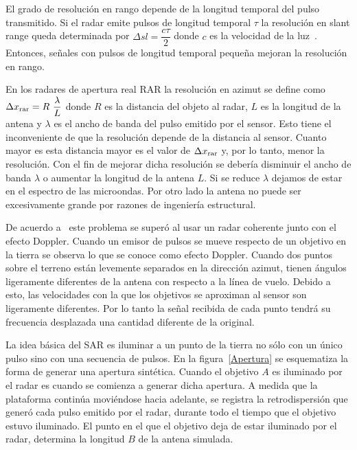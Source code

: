 El grado de resolución en rango depende de la longitud temporal del pulso transmitido. Si el radar emite pulsos de longitud temporal $\tau$ la resolución en slant range queda determinada por $\Delta sl= \dfrac{c \tau}{2}$ donde $c$ es la velocidad de la luz~\cite{Sarmap2009,Moreira2013}. Entonces, señales con pulsos de longitud temporal pequeña mejoran la resolución en rango.

En los radares de apertura real RAR la resolución en azimut se define como $\Delta x_{\tiny \text{rar}}= R \ \dfrac{\lambda}{L}$ donde $R$ es la distancia del objeto al radar, $L$ es la longitud de la antena y $\lambda$ es el ancho de banda del pulso emitido por el sensor. Esto tiene el inconveniente de que la resolución depende de la distancia al sensor. Cuanto mayor es esta distancia mayor es el valor de $\Delta x_{\tiny \text{rar}}$ y, por lo tanto, menor la resolución. Con el fin de mejorar dicha resolución se debería disminuir el ancho de banda $\lambda$ o aumentar la longitud de la antena $L$. Si se reduce $\lambda$ dejamos de estar en el espectro de las microondas. Por otro lado la antena no puede ser excesivamente grande por razones de ingeniería estructural.

De acuerdo a~\cite{Moreira2013} este problema se superó al usar un radar coherente junto con el efecto Doppler. Cuando un emisor de pulsos se mueve respecto de un objetivo en la tierra se observa lo que se conoce como efecto Doppler. Cuando dos puntos sobre el terreno están levemente separados en la dirección azimut, tienen ángulos ligeramente diferentes de la antena con respecto a la línea de vuelo. Debido a esto, las velocidades con la que los objetivos se aproximan al sensor son ligeramente diferentes. Por lo tanto la señal recibida de cada punto tendrá su frecuencia desplazada una cantidad diferente de la original. 

La idea básica del SAR es iluminar a un punto de la tierra no sólo con un único pulso sino con una secuencia de pulsos. En la figura~\ref{Apertura} se esquematiza la forma de generar una apertura sintética. Cuando el objetivo $A$ es iluminado por el radar es cuando se comienza a generar dicha apertura. A medida que la plataforma continúa moviéndose hacia adelante, se registra la retrodispersión que generó cada pulso emitido por el radar, durante todo el tiempo que el objetivo estuvo iluminado. El punto en el que el objetivo deja de estar iluminado por el radar, determina la longitud $B$ de la antena simulada. 

